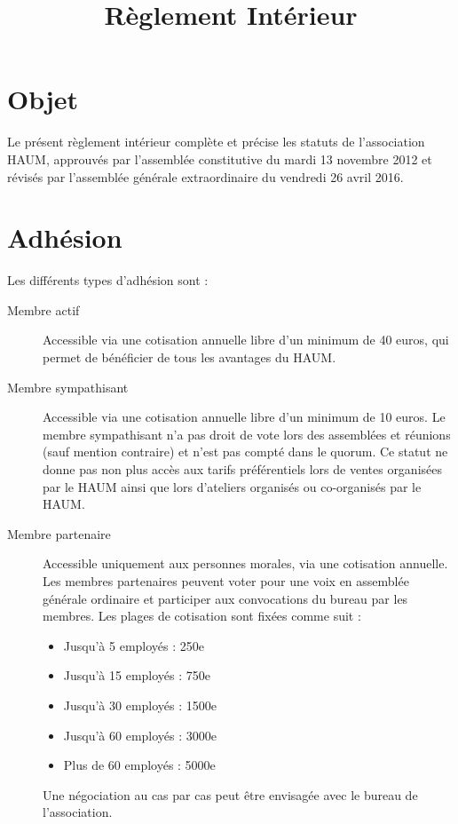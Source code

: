 \documentclass[a4paper, 11pt]{article}
\title{Règlement Intérieur}
\author{}
\date{}
\newcommand{\nomHS}{HAUM}
\newcommand{\dateAGC}{mardi 13 novembre 2012}
\newcommand{\dateAGE}{vendredi 26 avril 2016}
\newcommand{\prixSympatisant}{10 euros}
\begin{document}
    \maketitle

\section{Objet} %

Le présent règlement intérieur complète et précise les statuts de l'association \og{}\nomHS\fg{}, approuvés par l'assemblée
constitutive du \dateAGC{} et révisés par l'assemblée générale extraordinaire du \dateAGE{}.


\section{Adhésion} %

Les différents types d'adhésion sont :

\begin{description}
	\item[Membre actif] Accessible via une cotisation annuelle libre d'un minimum de 40 euros, qui permet de bénéficier de tous les avantages du HAUM.
	\item[Membre sympathisant] Accessible via une cotisation annuelle libre d'un minimum de \prixSympatisant{}. Le membre sympathisant n'a pas droit de vote lors des assemblées et réunions (sauf mention contraire) et n'est pas compté dans le quorum. Ce statut ne donne pas non plus accès aux tarifs préférentiels lors de ventes organisées par le \nomHS{} ainsi que lors d'ateliers organisés ou co-organisés par le \nomHS{}.
	\item[Membre partenaire] Accessible uniquement aux personnes morales, via une cotisation annuelle. 
    Les membres partenaires peuvent voter pour une voix en assemblée générale ordinaire et participer
    aux convocations du bureau par les membres.
    Les plages de cotisation sont fixées comme suit :
    \begin{itemize}
        \item Jusqu’à 5 employés : 250e
        \item Jusqu’à 15 employés : 750e
        \item Jusqu’à 30 employés : 1500e
        \item Jusqu’à 60 employés : 3000e
        \item Plus de 60 employés : 5000e
    \end{itemize}
    Une négociation au cas par cas peut être envisagée avec le bureau de l’association.
\end{description}
\end{document}
